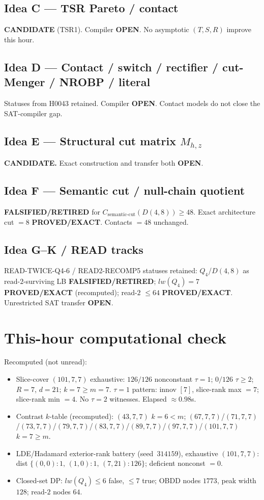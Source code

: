 \documentclass[11pt]{article}
\begin{document}
\subsection*{Idea C --- TSR Pareto / contact}
\textbf{CANDIDATE} (TSR1). Compiler \textbf{OPEN}. No asymptotic $(T,S,R)$ improve this hour.

\subsection*{Idea D --- Contact / switch / rectifier / cut-Menger / NROBP / literal}
Statuses from H0043 retained. Compiler \textbf{OPEN}. Contact models do not close the SAT-compiler gap.

\subsection*{Idea E --- Structural cut matrix $M_{h,z}$}
\textbf{CANDIDATE.} Exact construction and transfer both \textbf{OPEN}.

\subsection*{Idea F --- Semantic cut / null-chain quotient}
\textbf{FALSIFIED/RETIRED} for $C_{\mathrm{semantic\textrm{-}cut}}(D(4,8))\ge48$.
Exact architecture cut $=8$ \textbf{PROVED/EXACT}. Contacts $=48$ unchanged.

\subsection*{Idea G--K / READ tracks}
READ-TWICE-Q4-6 / READ2-RECOMP5 statuses retained: $Q_4$/$D(4,8)$ as read-$2$-surviving LB
\textbf{FALSIFIED/RETIRED}; $lw(Q_4)=7$ \textbf{PROVED/EXACT} (recomputed); read-$2$ $\le64$
\textbf{PROVED/EXACT}. Unrestricted SAT transfer \textbf{OPEN}.

\section*{This-hour computational check}
Recomputed (not unread):
\begin{itemize}
\item Slice-cover $(101,7,7)$ exhaustive: $126/126$ nonconstant $\tau{=}1$;
  $0/126$ $\tau{\ge}2$; $R{=}7$, $d{=}21$; $k{=}7{\ge}m{=}7$.
  $\tau{=}1$ pattern: innov $[7]$, slice-rank max $=7$; slice-rank min $=4$.
  No $\tau{=}2$ witnesses. Elapsed $\approx0.98$s.
\item Contrast $k$-table (recomputed): $(43,7,7)$ $k{=}6{<}m$;
  $(67,7,7)$/$(71,7,7)$/$(73,7,7)$/$(79,7,7)$/$(83,7,7)$/$(89,7,7)$/$(97,7,7)$/$(101,7,7)$ $k{=}7{\ge}m$.
\item LDE/Hadamard exterior-rank battery (seed~$314159$), exhaustive $(101,7,7)$:
  dist $\{(0,0){:}1,\,(1,0){:}1,\,(7,21){:}126\}$; deficient nonconst $=0$.
\item Closed-set DP: $lw(Q_4)\le6$ false, $\le7$ true; OBDD nodes $1773$, peak width $128$;
  read-$2$ nodes $64$.
\end{itemize}
\end{document}
